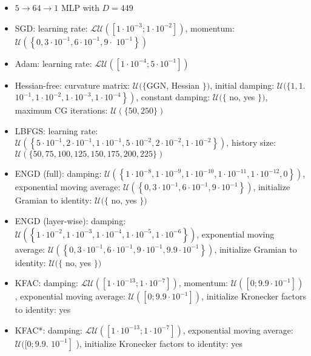 \documentclass[10pt]{article}
\begin{document}
\begin{itemize}
  \item $5 \rightarrow 64 \rightarrow 1$ MLP with $D=449$
  \item SGD: learning rate: $\mathcal{L U}\left(\left[1 \cdot 10^{-3} ; 1 \cdot 10^{-2}\right]\right)$, momentum: $\mathcal{U}\left(\left\{0,3 \cdot 10^{-1}, 6 \cdot 10^{-1}, 9 \cdot\right.\right.$ $\left.\left.10^{-1}\right\}\right)$
  \item Adam: learning rate: $\mathcal{L U}\left(\left[1 \cdot 10^{-4} ; 5 \cdot 10^{-1}\right]\right)$
  \item Hessian-free: curvature matrix: $\mathcal{U}(\{\mathrm{GGN}$, Hessian $\})$, initial damping: $\mathcal{U}(\{1,1$. $\left.\left.10^{-1}, 1 \cdot 10^{-2}, 1 \cdot 10^{-3}, 1 \cdot 10^{-4}\right\}\right)$, constant damping: $\mathcal{U}(\{$ no, yes $\})$, maximum CG iterations: $\mathcal{U}(\{50,250\})$
  \item LBFGS: learning rate: $\mathcal{U}\left(\left\{5 \cdot 10^{-1}, 2 \cdot 10^{-1}, 1 \cdot 10^{-1}, 5 \cdot 10^{-2}, 2 \cdot 10^{-2}, 1 \cdot 10^{-2}\right\}\right)$, history size: $\mathcal{U}(\{50,75,100,125,150,175,200,225\})$
  \item ENGD (full): damping: $\mathcal{U}\left(\left\{1 \cdot 10^{-8}, 1 \cdot 10^{-9}, 1 \cdot 10^{-10}, 1 \cdot 10^{-11}, 1 \cdot 10^{-12}, 0\right\}\right)$, exponential moving average: $\mathcal{U}\left(\left\{0,3 \cdot 10^{-1}, 6 \cdot 10^{-1}, 9 \cdot 10^{-1}\right\}\right)$, initialize Gramian to identity: $\mathcal{U}(\{$ no, yes $\})$
  \item ENGD (layer-wise): damping: $\mathcal{U}\left(\left\{1 \cdot 10^{-2}, 1 \cdot 10^{-3}, 1 \cdot 10^{-4}, 1 \cdot 10^{-5}, 1 \cdot 10^{-6}\right\}\right)$, exponential moving average: $\mathcal{U}\left(\left\{0,3 \cdot 10^{-1}, 6 \cdot 10^{-1}, 9 \cdot 10^{-1}, 9.9 \cdot 10^{-1}\right\}\right)$, initialize Gramian to identity: $\mathcal{U}(\{$ no, yes $\})$
  \item KFAC: damping: $\mathcal{L U}\left(\left[1 \cdot 10^{-13} ; 1 \cdot 10^{-7}\right]\right)$, momentum: $\mathcal{U}\left(\left[0 ; 9.9 \cdot 10^{-1}\right]\right)$, exponential moving average: $\mathcal{U}\left(\left[0 ; 9.9 \cdot 10^{-1}\right]\right)$, initialize Kronecker factors to identity: yes
  \item KFAC*: damping: $\mathcal{L U}\left(\left[1 \cdot 10^{-13} ; 1 \cdot 10^{-7}\right]\right)$, exponential moving average: $\mathcal{U}([0 ; 9.9$. $\left.10^{-1}\right]$ ), initialize Kronecker factors to identity: yes

\end{itemize}
\end{document}
